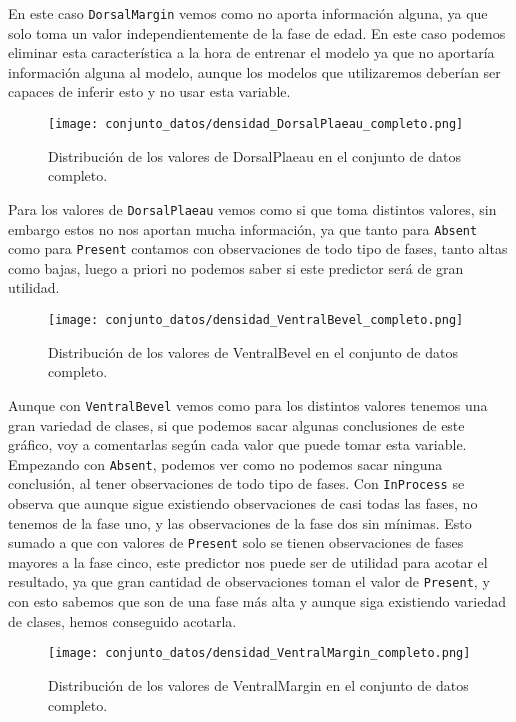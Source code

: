 En este caso \texttt{DorsalMargin} vemos como no aporta información alguna, ya que solo toma un valor independientemente de la fase de edad. En este caso podemos eliminar esta característica a la hora de entrenar el modelo ya que no aportaría información alguna al modelo, aunque los modelos que utilizaremos deberían ser capaces de inferir esto y no usar esta variable.


\begin{figure}[H]
	\centering
	\texttt{[image: conjunto\_datos/densidad\_DorsalPlaeau\_completo.png]}
	\caption{Distribución de los valores de DorsalPlaeau en el conjunto de datos completo.}
	\label{fig:densidad_DorsalPlaeau_completo}
\end{figure}

Para los valores de \texttt{DorsalPlaeau} vemos como si que toma distintos valores, sin embargo estos no nos aportan mucha información, ya que tanto para \texttt{Absent} como para \texttt{Present} contamos con observaciones de todo tipo de fases, tanto altas como bajas, luego a priori no podemos saber si este predictor será de gran utilidad.


\begin{figure}[H]
	\centering
	\texttt{[image: conjunto\_datos/densidad\_VentralBevel\_completo.png]}
	\caption{Distribución de los valores de VentralBevel en el conjunto de datos completo.}
	\label{fig:densidad_VentralBevel_completo}
\end{figure}

Aunque con \texttt{VentralBevel} vemos como para los distintos valores tenemos una gran variedad de clases, si que podemos sacar algunas conclusiones de este gráfico, voy a comentarlas según cada valor que puede tomar esta variable. Empezando con \texttt{Absent}, podemos ver como no podemos sacar ninguna conclusión, al tener observaciones de todo tipo de fases. Con \texttt{InProcess} se observa que aunque sigue existiendo observaciones de casi todas las fases, no tenemos de la fase uno, y las observaciones de la fase dos sin mínimas. Esto sumado a que con valores de \texttt{Present} solo se tienen observaciones de fases mayores a la fase cinco, este predictor nos puede ser de utilidad para acotar el resultado, ya que gran cantidad de observaciones toman el valor de \texttt{Present}, y con esto sabemos que son de una fase más alta y aunque siga existiendo variedad de clases, hemos conseguido acotarla.

\begin{figure}[H]
	\centering
	\texttt{[image: conjunto\_datos/densidad\_VentralMargin\_completo.png]}
	\caption{Distribución de los valores de VentralMargin en el conjunto de datos completo.}
	\label{fig:densidad_VentralMargin_completo}
\end{figure}


